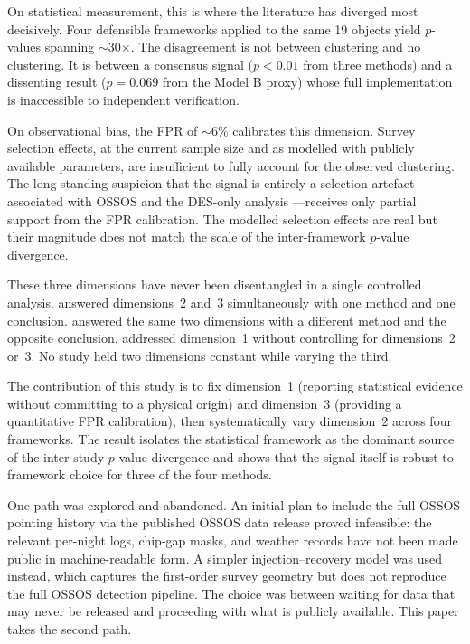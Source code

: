\documentclass[usenatbib]{mnras}
\begin{document}
On statistical measurement, this is where the literature has diverged most decisively. Four defensible frameworks applied to the same 19 objects yield $p$-values spanning $\sim$30$\times$. The disagreement is not between clustering and no clustering. It is between a consensus signal ($p<0.01$ from three methods) and a dissenting result ($p=0.069$ from the Model B proxy) whose full implementation is inaccessible to independent verification.

On observational bias, the FPR of $\sim6\%$ calibrates this dimension. Survey selection effects, at the current sample size and as modelled with publicly available parameters, are insufficient to fully account for the observed clustering. The long-standing suspicion that the signal is entirely a selection artefact---associated with OSSOS \citep{shankman2017} and the DES-only analysis \citep{bernardinelli2020}---receives only partial support from the FPR calibration. The modelled selection effects are real but their magnitude does not match the scale of the inter-framework $p$-value divergence.

These three dimensions have never been disentangled in a single controlled analysis. \citet{batygin2016,brown2019} answered dimensions~2 and~3 simultaneously with one method and one conclusion. \citet{shankman2017} answered the same two dimensions with a different method and the opposite conclusion. \citet{madigan2018} addressed dimension~1 without controlling for dimensions~2 or~3. No study held two dimensions constant while varying the third.

The contribution of this study is to fix dimension~1 (reporting statistical evidence without committing to a physical origin) and dimension~3 (providing a quantitative FPR calibration), then systematically vary dimension~2 across four frameworks. The result isolates the statistical framework as the dominant source of the inter-study $p$-value divergence and shows that the signal itself is robust to framework choice for three of the four methods.

One path was explored and abandoned. An initial plan to include the full OSSOS pointing history via the published OSSOS data release proved infeasible: the relevant per-night logs, chip-gap masks, and weather records have not been made public in machine-readable form. A simpler injection--recovery model was used instead, which captures the first-order survey geometry but does not reproduce the full OSSOS detection pipeline. The choice was between waiting for data that may never be released and proceeding with what is publicly available. This paper takes the second path.
\end{document}
